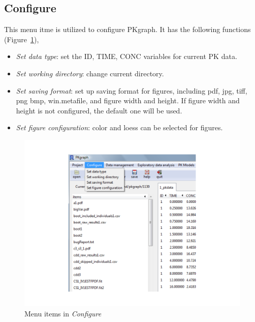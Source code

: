 \documentclass[a4paper]{article}
\begin{document}
\subsection{Configure}
This menu itme is utilized to configure PKgraph. It has the following functions (Figure~\ref{configure}),
\begin{itemize}
	\item \textit{Set data type}: set the ID, TIME, CONC variables for current PK data.
	\item \textit{Set working directory}: change current directory.
	\item \textit{Set saving format}: set up saving format for figures, including pdf, jpg, tiff, png
  bmp, win.metafile, and figure width and height. If figure width and height is not configured, the default one
  will be used.
	\item \textit{Set figure configuration}: color and loess can be selected for figures.
\end{itemize}
\begin{figure}[h!tb] \centering
\includegraphics[scale=0.6]{configure.pdf}
\caption{Menu items in \textit{Configure}}
\label{configure}
\end{figure}
\end{document}
